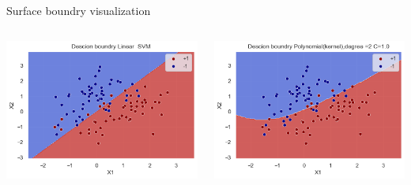 \documentclass[12pt,t]{beamer}
\begin{document}
\begin{frame}[t]
    \scriptsize
    \large Surface boundry visualization 

    \begin{columns}
        \begin{column}[]{0.5\linewidth}
            \includegraphics[width=\linewidth]{./images/p1a/1/d1.png}
        \end{column}
        \begin{column}[]{0.5\linewidth}
            \includegraphics[width=\linewidth]{images/p1a/1/d2.png}
        \end{column}
        
    \end{columns}


\end{frame}
\end{document}
